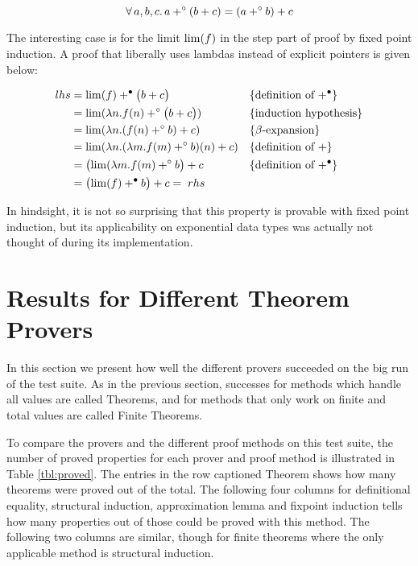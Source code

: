 \newcommand{\Lim}{\fn{lim}}
\newcommand{\pw}{\fixw{+}}
\newcommand{\pb}{\fixb{+}}

\begin{equation*}
\faaa{a}{b}{c} a \pw (b + c) = (a \pw b) + c
\end{equation*}

\noindent
The interesting case is for the limit $\Lim(f)$ in the step part of
proof by fixed point induction. A proof that liberally uses
lambdas instead of explicit pointers is given below:

\begin{align*}
lhs = & \; \Lim (f) \pb \big(b + c\big)                       && \{\textrm{definition of $\pb$}\}\\
    = & \; \Lim (\lambda n . f(n) \pw \big(b + c\big))        && \{\textrm{induction hypothesis}\}\\
    = & \; \Lim (\lambda n . (f(n) \pw b) + c)                && \{\textrm{$\beta$-expansion}\}\\
    = & \; \Lim (\lambda n . (\lambda m . f(m) \pw b)(n) + c) && \{\textrm{definition of $+$}\}\\
    = & \; \big(\Lim (\lambda m . f(m) \pw b\big) + c         && \{\textrm{definition of $\pb$}\}\\
    = & \; \big(\Lim (f) \pb b\big) + c = \; rhs
\end{align*}

In hindsight, it is not so surprising that this property is provable
with fixed point induction, but its applicability on exponential data
types was actually not thought of during its implementation.

\section{Results for Different Theorem Provers}

In this section we present how well the different provers succeeded on
the big run of the test suite. As in the previous section, successes for
methods which handle all values are called Theorems, and for methods
that only work on finite and total values are called Finite Theorems.

To compare the provers and the different proof methods on this test
suite, the number of proved properties for each prover and proof
method is illustrated in Table \ref{tbl:proved}. The entries in the
row captioned Theorem shows how many theorems were proved out of the
total. The following four columns for definitional equality,
structural induction, approximation lemma and fixpoint induction tells
how many properties out of those could be proved with this method. The
following two columns are similar, though for finite theorems where the
only applicable method is structural induction.

